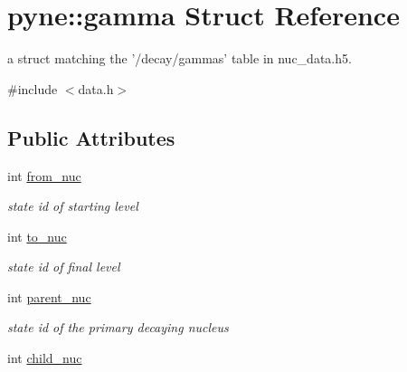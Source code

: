 \hypertarget{structpyne_1_1gamma}{\section{pyne\-:\-:gamma Struct Reference}
\label{structpyne_1_1gamma}
}


a struct matching the '/decay/gammas' table in nuc\-\_\-data.\-h5.  




{\ttfamily \#include $<$data.\-h$>$}

\subsection*{Public Attributes}
\begin{DoxyCompactItemize}
\item 
\hypertarget{structpyne_1_1gamma_a1c5b7ef9f75c628193a0872c9ae172e4}{int \hyperlink{structpyne_1_1gamma_a1c5b7ef9f75c628193a0872c9ae172e4}{from\-\_\-nuc}}\label{structpyne_1_1gamma_a1c5b7ef9f75c628193a0872c9ae172e4}

\begin{DoxyCompactList}\small\item\em state id of starting level \end{DoxyCompactList}\item 
\hypertarget{structpyne_1_1gamma_af9ed390289a667c82464c859dbccb0a4}{int \hyperlink{structpyne_1_1gamma_af9ed390289a667c82464c859dbccb0a4}{to\-\_\-nuc}}\label{structpyne_1_1gamma_af9ed390289a667c82464c859dbccb0a4}

\begin{DoxyCompactList}\small\item\em state id of final level \end{DoxyCompactList}\item 
\hypertarget{structpyne_1_1gamma_a947386fa2557f57cc14f79d6904185bd}{int \hyperlink{structpyne_1_1gamma_a947386fa2557f57cc14f79d6904185bd}{parent\-\_\-nuc}}\label{structpyne_1_1gamma_a947386fa2557f57cc14f79d6904185bd}

\begin{DoxyCompactList}\small\item\em state id of the primary decaying nucleus \end{DoxyCompactList}\item 
\hypertarget{structpyne_1_1gamma_a99fcb3ccd78db851f7104ff3ab59048d}{int \hyperlink{structpyne_1_1gamma_a99fcb3ccd78db851f7104ff3ab59048d}{child\-\_\-nuc}}\label{structpyne_1_1gamma_a99fcb3ccd78db851f7104ff3ab59048d}


\end{DoxyCompactItemize}
